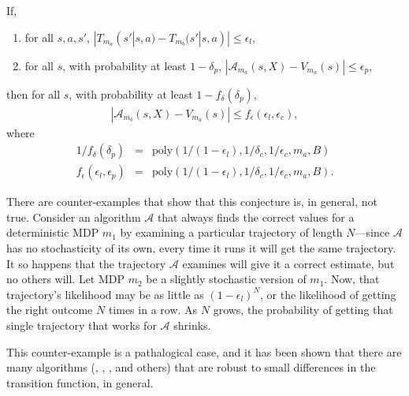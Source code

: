 If,
\begin{enumerate}
\item \label{mcts-bound} for all $s,a,s'$, $|T_{m_a}(s'|s,a) - T_{m_b}(s'|s,a)| \leq \epsilon_l$,
\item \label{mcts-good} for all $s$, with probability at least $1-\delta_p$, $|\mathcal{A}_{m_a}(s,X)-V_{m_a}(s)|\leq \epsilon_p$,
\end{enumerate}
then for all $s$, with probability at least $1-f_\delta(\delta_p)$,
\begin{eqnarray}
|\mathcal{A}_{m_b}(s,X)-V_{m_a}(s)|\leq f_\epsilon(\epsilon_l, \epsilon_c),
\end{eqnarray}
where
\begin{eqnarray}
1/f_\delta(\delta_p)&=&\mbox{poly}(1/(1-\epsilon_l),1/\delta_c,1/\epsilon_c,m_a,B)\\
f_\epsilon(\epsilon_l, \epsilon_p)&=&\mbox{poly}(1/(1-\epsilon_l),1/\delta_c,1/\epsilon_c,m_a,B).
\end{eqnarray}



There are counter-examples that show that this conjecture is, in general, not true. Consider an algorithm $\mathcal{A}$ that always finds the correct values for a deterministic MDP $m_1$ by examining a particular trajectory of length $N$---since $\mathcal{A}$ has no stochasticity of its own, every time it runs it will get the same trajectory. It so happens that the trajectory $\mathcal{A}$ examines will give it a correct estimate, but no others will. Let MDP $m_2$ be a slightly stochastic version of $m_1$. Now, that trajectory's likelihood may be as little as $(1-\epsilon_l)^N$, or the likelihood of getting the right outcome $N$ times in a row. As $N$ grows, the probability of getting that single trajectory that works for $\mathcal{A}$ shrinks.

This counter-example is a pathalogical case, and it has been shown that there are many algorithms (, , , and others) that are robust to small differences in the transition function, in general.

